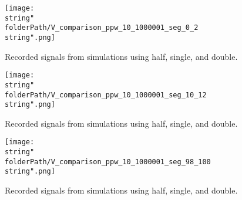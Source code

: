 \renewcommand{\folderPath}{\string"./fig/2D_example/marmousi2_101_401/nvidia_plot_dt_h_10_1p000165939331055e-04_00_dt_s_10_9p999999747378752e-05_00_dt_d_10_1p000000000000000e-04_00/half_chop_D_chop_dx_chop_dt_single_double/\string"}
%
\begin{figure}[H]
\captionsetup{width=1\textwidth, font=footnotesize,labelfont=footnotesize}
\centering\texttt{[image: \\string"\\folderPath/V\_comparison\_ppw\_10\_1000001\_seg\_0\_2\\string".png]}
\caption{Recorded signals from simulations using half, single, and double.}
\label{comparison_V_half_compensated_single_double_ppw_10_seg_0_2_marmousi2_naive}
\end{figure}
%
\begin{figure}[H]
\captionsetup{width=1\textwidth, font=footnotesize,labelfont=footnotesize}
\centering\texttt{[image: \\string"\\folderPath/V\_comparison\_ppw\_10\_1000001\_seg\_10\_12\\string".png]}
\caption{Recorded signals from simulations using half, single, and double.}
\label{comparison_V_half_compensated_single_double_ppw_10_seg_10_12_marmousi2_naive}
\end{figure}
%
\begin{figure}[H]
\captionsetup{width=1\textwidth, font=footnotesize,labelfont=footnotesize}
\centering\texttt{[image: \\string"\\folderPath/V\_comparison\_ppw\_10\_1000001\_seg\_98\_100\\string".png]}
\caption{Recorded signals from simulations using half, single, and double.}
\label{comparison_V_half_compensated_single_double_ppw_10_seg_98_100_marmousi2_naive}
\end{figure}
%
\renewcommand{\folderPath}{\string"/dev/null\string"}


% 
% 


% 